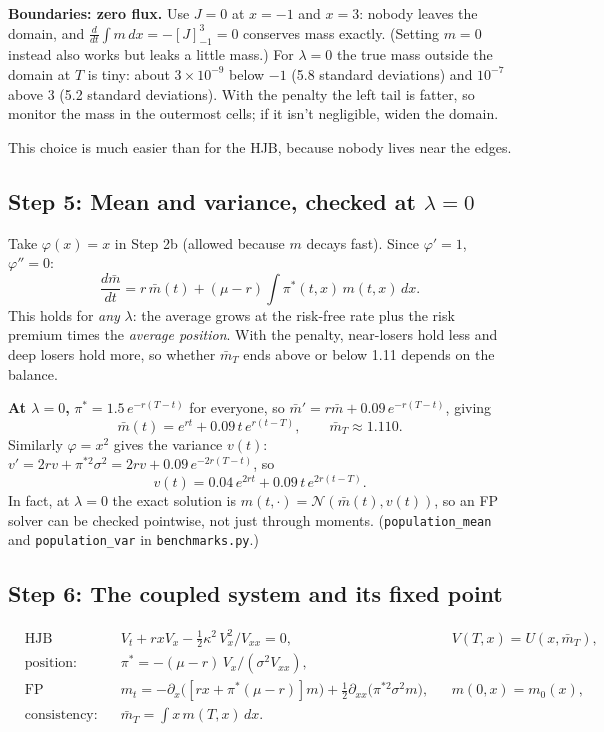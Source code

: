 \documentclass[11pt]{article}
\newcommand{\mb}{\bar m}
\begin{document}
\textbf{Boundaries: zero flux.} Use $J=0$ at $x=-1$ and $x=3$: nobody leaves the domain, and
$\frac{d}{dt}\int m\,dx = -[J]_{-1}^{3} = 0$ conserves mass exactly. (Setting $m=0$ instead
also works but leaks a little mass.) For $\lambda=0$ the true mass outside the domain at $T$
is tiny: about $3\times10^{-9}$ below $-1$ (5.8 standard deviations) and $10^{-7}$ above 3
(5.2 standard deviations). With the penalty the left tail is fatter, so monitor the mass in
the outermost cells; if it isn't negligible, widen the domain.

This choice is much easier than for the HJB, because nobody lives near the edges.

\subsection*{Step 5: Mean and variance, checked at \texorpdfstring{$\lambda=0$}{lambda = 0}}
Take $\varphi(x)=x$ in Step 2b (allowed because $m$ decays fast). Since $\varphi'=1$,
$\varphi''=0$:
\[
  \boxed{\;\frac{d\mb}{dt} = r\,\mb(t) + (\mu-r)\int\pi^*(t,x)\,m(t,x)\,dx .\;}
\]
This holds for \emph{any} $\lambda$: the average grows at the risk-free rate plus the risk
premium times the \emph{average position}. With the penalty, near-losers hold less and deep
losers hold more, so whether $\mb_T$ ends above or below 1.11 depends on the balance.

\textbf{At $\lambda=0$,} $\pi^*=1.5\,e^{-r(T-t)}$ for everyone, so
$\mb'=r\mb+0.09\,e^{-r(T-t)}$, giving
\[
  \mb(t) = e^{rt} + 0.09\,t\,e^{r(t-T)},\qquad \mb_T \approx 1.110 .
\]
Similarly $\varphi=x^2$ gives the variance $v(t)$: $v' = 2rv + \pi^{*2}\sigma^2
= 2rv + 0.09\,e^{-2r(T-t)}$, so
\[
  v(t) = 0.04\,e^{2rt} + 0.09\,t\,e^{2r(t-T)} .
\]
In fact, at $\lambda=0$ the exact solution is $m(t,\cdot)=\mathcal N(\mb(t),v(t))$, so an FP
solver can be checked pointwise, not just through moments. (\texttt{population\_mean} and
\texttt{population\_var} in \texttt{benchmarks.py}.)

\subsection*{Step 6: The coupled system and its fixed point}
\label{sec:system}
\begin{keyidea}
\vspace{-6pt}
\begin{align*}
  &\text{HJB (backward):} && V_t + rxV_x - \tfrac12\kappa^2\,V_x^2/V_{xx} = 0,
     && V(T,x) = U(x,\mb_T),\\
  &\text{position:}       && \pi^* = -(\mu-r)\,V_x/(\sigma^2V_{xx}), \\
  &\text{FP (forward):}   && m_t = -\partial_x\bigl([rx+\pi^*(\mu-r)]m\bigr)
                               + \tfrac12\partial_{xx}\bigl(\pi^{*2}\sigma^2m\bigr),
     && m(0,x) = m_0(x),\\
  &\text{consistency:}    && \mb_T = \textstyle\int x\,m(T,x)\,dx .
\end{align*}
\end{keyidea}
\end{document}
